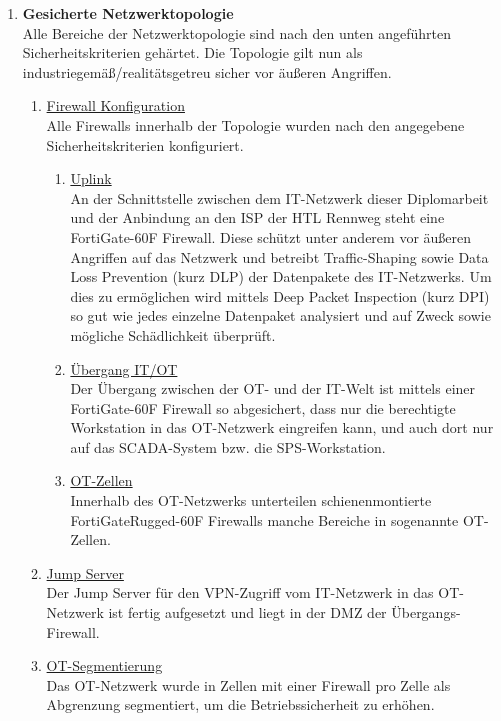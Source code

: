 \documentclass[
	headings=optiontotocandhead,%
	oneside,
	numbers=noenddot,%
	toc=flat, %
	10pt, %
	parskip=full, %
	listof=totoc, %
	listof=flat, %
	numbers=noenddot, %
	bibliography=totoc, %
	a4paper,DIV=14,
]{scrartcl}
\begin{document}
\begin{enumerate}[start=1,label={\bfseries Ziel-H \arabic*},leftmargin=*,wide]
\begin{enumerate}[label=\alph*.]
\end{enumerate}
\item{\bfseries{Gesicherte Netzwerktopologie}}\\
Alle Bereiche der Netzwerktopologie sind nach den unten angeführten Sicherheitskriterien gehärtet. Die Topologie gilt nun als industriegemäß/realitätsgetreu sicher vor äußeren Angriffen.

\begin{enumerate}[label=\alph*.]
\item{\underline{Firewall Konfiguration}}\\
Alle Firewalls innerhalb der Topologie wurden nach den angegebene Sicherheitskriterien konfiguriert. 

\begin{enumerate}[label=\roman*.]
\item{\underline{Uplink}}\\
An der Schnittstelle zwischen dem IT-Netzwerk dieser Diplomarbeit und der Anbindung an den ISP der HTL Rennweg steht eine FortiGate-60F Firewall. Diese schützt unter anderem vor äußeren Angriffen auf das Netzwerk und betreibt Traffic-Shaping sowie Data Loss Prevention (kurz DLP) der Datenpakete des IT-Netzwerks. Um dies zu ermöglichen wird mittels Deep Packet Inspection (kurz DPI) so gut wie jedes einzelne Datenpaket analysiert und auf Zweck sowie mögliche Schädlichkeit überprüft.

\item{\underline{Übergang IT/OT}}\\
Der Übergang zwischen der OT- und der IT-Welt ist mittels einer FortiGate-60F Firewall so abgesichert, dass nur die berechtigte Workstation in das OT-Netzwerk eingreifen kann, und auch dort nur auf das SCADA-System bzw. die SPS-Workstation.

\item{\underline{OT-Zellen}}\\
Innerhalb des OT-Netzwerks unterteilen schienenmontierte FortiGateRugged-60F Firewalls manche Bereiche in sogenannte OT-Zellen.
\end{enumerate}

\item{\underline{Jump Server}}\\
Der Jump Server für den VPN-Zugriff vom IT-Netzwerk in das OT-Netzwerk ist fertig aufgesetzt und liegt in der DMZ der Übergangs-Firewall.

\item{\underline{OT-Segmentierung}}\\
Das OT-Netzwerk wurde in Zellen mit einer Firewall pro Zelle als Abgrenzung segmentiert, um die Betriebssicherheit zu erhöhen.


\end{enumerate}
\end{enumerate}
\end{document}
